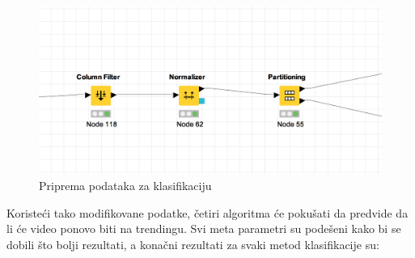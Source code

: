 \documentclass[a4paper]{article}
\theoremstyle{definition}
\begin{document}
\begin{figure}[h!]
\begin{center}
    \includegraphics[width=1\textwidth]{before_classification.png}
    \caption{Priprema podataka za klasifikaciju}
\end{center}
\end{figure}

Koristeći tako modifikovane podatke, četiri algoritma će pokušati da predvide da li će video ponovo biti na trendingu. Svi meta parametri su podešeni kako bi se dobili što bolji rezultati, a konačni rezultati za svaki metod klasifikacije su:

\begingroup

\renewcommand\arraystretch{1.3}
\end{document}
